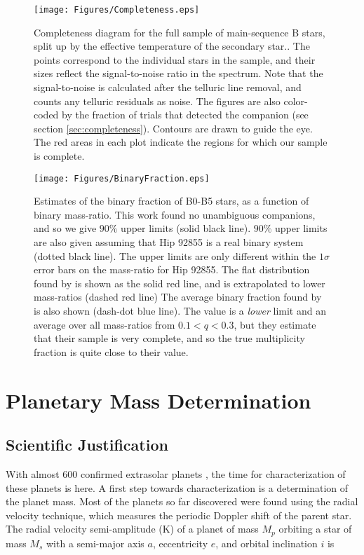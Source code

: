 \documentclass[11pt]{report}     %
\begin{document}
\begin{figure}[ht]
  \centering
  \texttt{[image: Figures/Completeness.eps]}
  \caption{Completeness diagram for the full sample of main-sequence B
  stars, split up by the effective temperature of the secondary
  star.. The points correspond to the individual stars in the sample,
  and their sizes reflect the signal-to-noise ratio in the
  spectrum. Note that the signal-to-noise is calculated after the
  telluric line removal, and counts any telluric residuals as
  noise. The figures are also color-coded by the fraction of trials
  that detected the companion (see section
  \ref{sec:completeness}). Contours are drawn to guide the eye. The red 
  areas in each plot indicate the regions for which our sample is complete.}
  \label{fig:completeness}
\end{figure}


\begin{figure}[ht]
  \centering
  \texttt{[image: Figures/BinaryFraction.eps]}
  \caption{Estimates of the binary fraction of B0-B5 stars,
    as a function of binary mass-ratio. This work found no unambiguous companions,
    and so we give $90\%$ upper limits (solid black line). $90\%$
    upper limits are also given assuming that Hip 92855 is a real
    binary system (dotted black line). The upper limits are only different within the
    $1\sigma$ error bars on the mass-ratio for Hip 92855. The flat 
    distribution found by \cite{Sana2011} is shown as the solid red line,
    and is extrapolated to lower mass-ratios (dashed red line) The average binary 
    fraction found by \cite{Evans2011} is also shown (dash-dot blue line). The
    \cite{Evans2011} value is a \emph{lower} limit and an average over all mass-ratios from $0.1 < q < 0.3$, but they estimate
    that their sample is very complete, and so the true multiplicity fraction is quite close to their value.}
  \label{fig:limits}
\end{figure}


\chapter{Planetary Mass Determination}
\section{Scientific Justification}
With almost 600 confirmed extrasolar planets \citep[from
exoplanets.org:][]{exoplanet}, the time for characterization of these
planets is here. A first step towards characterization is a determination of
the planet mass. Most of the planets so far discovered were
found using the radial velocity technique, which measures the periodic
Doppler shift of the parent star. The radial velocity semi-amplitude
(K) of a planet of mass $M_p$ orbiting a star of mass $M_s$ with a
semi-major axis $a$, eccentricity $e$, and orbital inclination $i$ is
\end{document}
